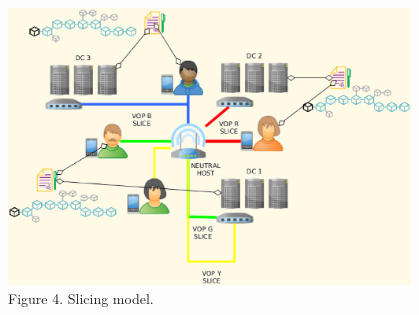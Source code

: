 \documentclass[12pt]{amsart}
\begin{document}
\begin{center}
  \includegraphics[keepaspectratio, width=0.8\textwidth]{images/bc5g/slices-y.eps}
\\
Figure 4. Slicing model.
\\
\end{center}
\begin{multicols}{2}


\end{multicols}
\end{document}
